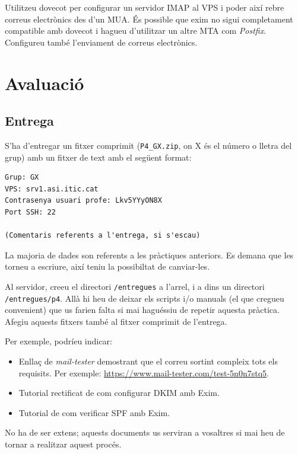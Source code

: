 \documentclass{practicaitic}
\begin{document}
\begin{tasca}
  Utilitzeu dovecot per configurar un servidor IMAP al VPS i poder així rebre
  correus electrònics des d'un MUA. És possible que exim no sigui completament
  compatible amb dovecot i hagueu d'utilitzar un altre MTA com \textit{Postfix}.
  Configureu també l'enviament de correus electrònics.
\end{tasca}

\section{Avaluació}
\subsection{Entrega}
\label{sec:entrega}

S'ha d'entregar un fitxer comprimit (\texttt{P4\_GX.zip}, on X és el número o 
lletra del grup) amb un fitxer de text amb el següent format:

\begin{verbatim}
Grup: GX
VPS: srv1.asi.itic.cat
Contrasenya usuari profe: Lkv5YYyON8X
Port SSH: 22

(Comentaris referents a l'entrega, si s'escau)
\end{verbatim}

La majoria de dades son referents a les pràctiques anteriors. Es demana
que les torneu a escriure, així teniu la possibiltat de canviar-les.

Al servidor, creeu el directori \texttt{/entregues} a l'arrel, i a dins un
directori \texttt{/entregues/p4}. Allà hi heu de deixar els scripts i/o manuals
(el que cregueu convenient) que us farien falta si mai haguéssiu de repetir
aquesta pràctica. Afegiu aquests fitxers també al fitxer comprimit de l'entrega.

Per exemple, podríeu indicar:
\begin{itemize}
  \item Enllaç de \textit{mail-tester} demostrant que el correu sortint compleix tots
  els requisits. Per exemple: \url{https://www.mail-tester.com/test-5n0n7stq5}.
  \item Tutorial rectificat de com configurar DKIM amb Exim.
  \item Tutorial de com verificar SPF amb Exim.
\end{itemize}

No ha de ser extens; aquests documents us serviran a vosaltres si mai heu de
tornar a realitzar aquest procés.
\end{document}
